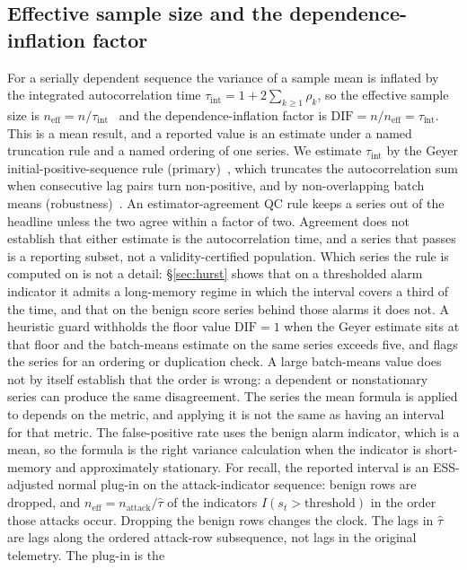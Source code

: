 \documentclass[a4paper,fleqn]{cas-dc}
\newcommand{\DIF}{\mathrm{DIF}}
\newcommand{\neff}{n_{\mathrm{eff}}}
\begin{document}
\subsection{Effective sample size and the dependence-inflation factor}
For a serially dependent sequence the variance of a sample mean is inflated by the integrated
autocorrelation time $\tau_{\mathrm{int}} = 1 + 2\sum_{k\ge 1}\rho_k$, so the effective sample size
is $\neff = n/\tau_{\mathrm{int}}$~\citep{geyer1992practical,vehtari2021ess} and the dependence-inflation factor is
$\DIF = n/\neff = \tau_{\mathrm{int}}$. This is a mean result, and a reported value is an estimate
under a named truncation rule and a named ordering of one series. We estimate $\tau_{\mathrm{int}}$
by the Geyer initial-positive-sequence rule (primary)~\citep{geyer1992practical}, which truncates the autocorrelation sum when consecutive
lag pairs turn non-positive, and by non-overlapping batch means
(robustness)~\citep{flegal2010batch}. An
estimator-agreement QC rule keeps a series out of the headline unless the two agree within a
factor of two. Agreement does not establish that either estimate is the autocorrelation time, and
a series that passes is a reporting subset, not a validity-certified population. Which series the
rule is computed on is not a detail: \S\ref{sec:hurst} shows that on a thresholded alarm indicator
it admits a long-memory regime in which the interval covers a third of the time, and that on the
benign score series behind those alarms it does not.
A heuristic guard withholds the floor value $\DIF=1$ when the Geyer estimate sits at that floor
and the batch-means estimate on the same series exceeds five, and flags the series for an
ordering or duplication check. A large batch-means value does not by itself establish that the
order is wrong: a dependent or nonstationary series can produce the same disagreement. The
series the mean formula is applied to depends on the metric, and applying it is not the same as
having an interval for that metric. The false-positive rate uses the benign alarm indicator, which
is a mean, so the formula is the right variance calculation when the indicator is short-memory and
approximately stationary. For recall, the reported interval is an ESS-adjusted normal plug-in on
the attack-indicator sequence: benign rows are dropped, and
$\neff = n_{\mathrm{attack}}/\hat\tau$ of the indicators $I(s_t>\mathrm{threshold})$ in the order
those attacks occur. Dropping the benign rows changes the clock. The lags in $\hat\tau$ are lags
along the ordered attack-row subsequence, not lags in the original telemetry. The plug-in is the
\end{document}

